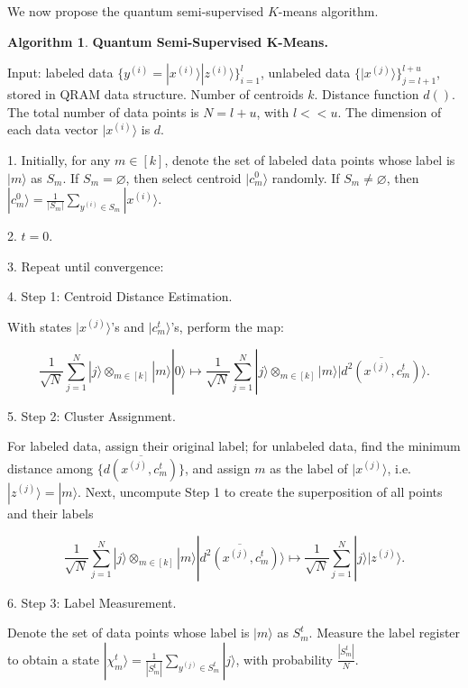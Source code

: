 \documentclass[11pt]{article}
\theoremstyle{definition}
\newtheorem{algorithm}{Algorithm}[section]
\def\zsi{z^{(i)}}
\def\zsj{z^{(j)}}
\def\xsi{x^{(i)}}
\def\xsj{x^{(j)}}
\def\ysi{y^{(i)}}
\def\ysj{y^{(j)}}
\begin{document}
We now propose the quantum semi-supervised $K$-means algorithm.

\begin{algorithm}
\textbf{Quantum Semi-Supervised K-Means.}

Input: labeled data $\{ \ysi = |\xsi\rangle |\zsi\rangle \}_{i = 1}^l$, unlabeled data $\{ |\xsj\rangle \}_{j = l+1}^{l + u}$, stored in QRAM data structure. Number of centroids $k$. Distance function $d()$. 
The total number of data points is $N = l + u$, with $l < < u$. The dimension of each data vector $|\xsi\rangle$ is $d$.

1. Initially, for any $m \in [k]$, denote the set of labeled data points whose label is $|m\rangle$ as $S_m$. If $S_m = \varnothing$, then select centroid $|c_m^0\rangle$ randomly. If $S_m \neq \varnothing$, then $|c_m^0\rangle = \frac{1}{|S_m|}\sum_{\ysi \in S_m} |\xsi\rangle$.

2. $t = 0.$

3. Repeat until convergence:


4. Step 1: Centroid Distance Estimation.

With states $|\xsj\rangle$'s and $|c_m^t\rangle$'s, perform the map:

\begin{equation*}
    \frac{1}{\sqrt{N}} \sum_{j=1}^{N} |j\rangle \otimes_{m \in [k]} |m\rangle |0\rangle
    \mapsto \frac{1}{\sqrt{N}} \sum_{j=1}^{N} |j\rangle \otimes_{m \in [k]} |m\rangle 
    |\overline{d^2(\xsj, c_m^t)}\rangle.
\end{equation*}


5. Step 2: Cluster Assignment.

For labeled data, assign their original label; for unlabeled data, find the minimum distance among $\{\overline{d(\xsj, c_m^t)} \}$, and assign $m$ as the label of $|\xsj\rangle$, i.e. $|\zsj\rangle = |m\rangle$. Next, uncompute Step 1 to create the superposition of all points and their labels

\begin{equation*}
     \frac{1}{\sqrt{N}} \sum_{j=1}^{N} |j\rangle \otimes_{m \in [k]} |m\rangle 
    |\overline{d^2(\xsj, c_m^t)}\rangle \mapsto
    \frac{1}{\sqrt{N}} \sum_{j=1}^{N} |j\rangle |\zsj\rangle.
\end{equation*}


6. Step 3: Label Measurement.

Denote the set of data points whose label is $|m\rangle$ as $S_m^t$. Measure the label register to obtain a state $|\chi_m^t\rangle = \frac{1}{|S_m^t|} \sum_{\ysj \in S_m^t} |j\rangle$, with probability $\frac{|S_m^t|}{N}$.


\end{algorithm}
\end{document}
